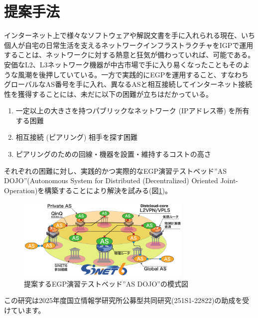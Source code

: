 \documentclass[Japanese]{dicomopapers}
\begin{document}
\section{提案手法}

インターネット上で様々なソフトウェアや解説文書を手に入れられる現在、いち個人が自宅の日常生活を支えるネットワークインフラストラクチャをIGPで運用することは、ネットワークに対する熱意と狂気が備わっていれば、可能である。安価なL2、L3ネットワーク機器が中古市場で手に入り易くなったこともそのような風潮を後押していている。一方で実践的にEGPを運用すること、すなわちグローバルなAS番号を手に入れ、異なるASと相互接続してインターネット接続性を獲得することには、未だに以下の困難が立ちはだかっている。

\begin{enumerate}
 \item 一定以上の大きさを持つパブリックなネットワーク (IPアドレス帯) を所有する困難
 \item 相互接続 (ピアリング) 相手を探す困難
 \item ピアリングのための回線・機器を設置・維持するコストの高さ
\end{enumerate}

それぞれの困難に対し、実践的かつ実際的なEGP演習テストベッド''AS DOJO''(Autonomous System for Distributed (Decentralized) Oriented Joint-Operation)を構築することにより解決を試みる(図\ref{AS_dojo})。

\begin{figure}[h]
\begin{center}
\includegraphics[width=84mm,clip]{AS_dojo.pdf}
\caption{提案するEGP演習テストベッド''AS DOJO''の模式図}
\label{AS_dojo}
\end{center}
\end{figure}

\begin{acknowledgment}
この研究は2025年度国立情報学研究所公募型共同研究(251S1-22822)の助成を受けています。
\end{acknowledgment}

\section*{}
\end{document}
